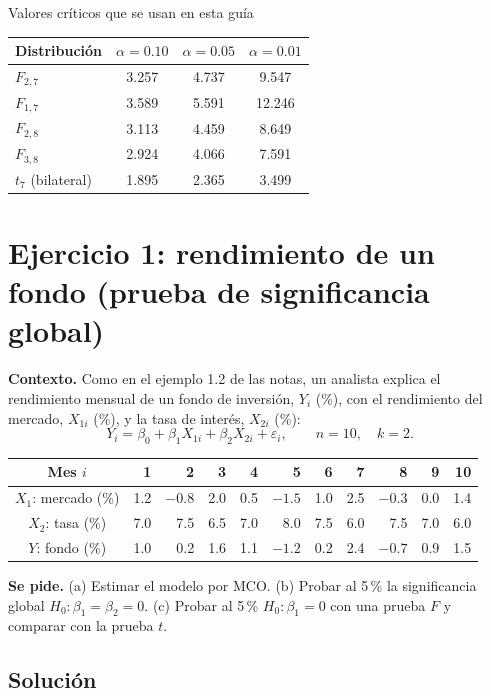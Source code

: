 \documentclass[11pt,letterpaper]{article}
\begin{document}
\begin{nota}{Valores críticos que se usan en esta guía}
\centering
\begin{tabular}{lccc}
\toprule
Distribución & $\alpha=0.10$ & $\alpha=0.05$ & $\alpha=0.01$\\
\midrule
$F_{2,7}$ & 3.257 & 4.737 & 9.547\\
$F_{1,7}$ & 3.589 & 5.591 & 12.246\\
$F_{2,8}$ & 3.113 & 4.459 & 8.649\\
$F_{3,8}$ & 2.924 & 4.066 & 7.591\\
$t_7$ (bilateral) & 1.895 & 2.365 & 3.499\\
\bottomrule
\end{tabular}
\end{nota}

\section{Ejercicio 1: rendimiento de un fondo (prueba de significancia global)}

\textbf{Contexto.} Como en el ejemplo 1.2 de las notas, un analista explica el rendimiento mensual de
un fondo de inversión, $Y_i$ (\%), con el rendimiento del mercado, $X_{1i}$ (\%), y la tasa de
interés, $X_{2i}$ (\%):
\[
Y_i=\beta_0+\beta_1X_{1i}+\beta_2X_{2i}+\varepsilon_i,\qquad n=10,\quad k=2.
\]
\begin{center}
\begin{tabular}{c*{10}{r}}
\toprule
Mes $i$ & 1 & 2 & 3 & 4 & 5 & 6 & 7 & 8 & 9 & 10\\
\midrule
$X_1$: mercado (\%) & 1.2 & $-0.8$ & 2.0 & 0.5 & $-1.5$ & 1.0 & 2.5 & $-0.3$ & 0.0 & 1.4\\
$X_2$: tasa (\%)    & 7.0 & 7.5 & 6.5 & 7.0 & 8.0 & 7.5 & 6.0 & 7.5 & 7.0 & 6.0\\
$Y$: fondo (\%)     & 1.0 & 0.2 & 1.6 & 1.1 & $-1.2$ & 0.2 & 2.4 & $-0.7$ & 0.9 & 1.5\\
\bottomrule
\end{tabular}
\end{center}

\textbf{Se pide.}
(a) Estimar el modelo por MCO.
(b) Probar al 5\,\% la significancia global $H_0:\beta_1=\beta_2=0$.
(c) Probar al 5\,\% $H_0:\beta_1=0$ con una prueba $F$ y comparar con la prueba $t$.

\subsection*{Solución}
\end{document}
